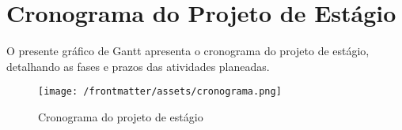 \chapter{Cronograma do Projeto de Estágio}
\label{AppendixA}

O presente gráfico de Gantt apresenta o cronograma do projeto de estágio, detalhando as fases e prazos das atividades planeadas.

\begin{figure}[h]
    \centering
    \texttt{[image: /frontmatter/assets/cronograma.png]}
    \caption{Cronograma do projeto de estágio}
    \label{fig:cronograma}
\end{figure}